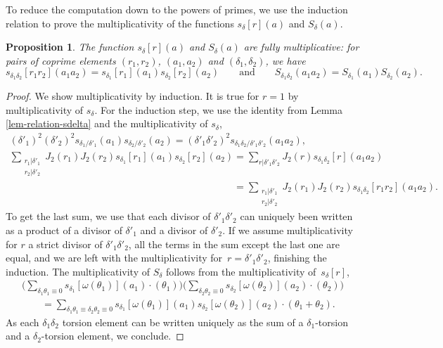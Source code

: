 \documentclass[11pt]{article}
\numberwithin{equation}{section}
\numberwithin{equation}{section}
\newtheorem{prop}[theo]{Proposition}
\theoremstyle{definition}
\begin{document}
To reduce the computation down to the powers of primes, we use the induction relation to prove the multiplicativity of the functions $s_\delta[r](a)$ and $S_\delta(a)$.

\begin{prop}\label{prop-multiplicativity-S}
The function $s_\delta[r](a)$ and $S_\delta(a)$ are fully multiplicative: for pairs of coprime elements $(r_1,r_2)$, $(a_1,a_2)$ and $(\delta_1,\delta_2)$, we have
\[ s_{\delta_1\delta_2}[r_1r_2](a_1a_2) = s_{\delta_1}[r_1](a_1)s_{\delta_2}[r_2](a_2)\qquad
\text{and}\qquad
S_{\delta_1\delta_2}(a_1a_2)=S_{\delta_1}(a_1)S_{\delta_2}(a_2). \]
\end{prop}

\begin{proof}
We show multiplicativity by induction. It is true for $r=1$ by multiplicativity of $s_\delta$. For the induction step, we use the identity from Lemma \ref{lem-relation-sdelta} and the multiplicativity of $s_\delta$,
\begin{gather*}
(\delta'_1)^2(\delta'_2)^2 s_{\delta_1/\delta'_1}(a_1)s_{\delta_2/\delta'_2}(a_2) = (\delta'_1\delta'_2)^2 s_{\delta_1\delta_2/\delta'_1\delta'_2}(a_1a_2), \\
\sum_{\substack{r_1|\delta'_1 \\ r_2|\delta'_2}} J_2(r_1)J_2(r_2)s_{\delta_1}[r_1](a_1)s_{\delta_2}[r_2](a_2) = \sum_{r|\delta'_1\delta'_2} J_2(r)s_{\delta_1\delta_2}[r](a_1a_2) \\
 \phantom{\sum_{\substack{r_1|\delta'_1 \\ r_2|\delta'_2}} J_2(r_1)J_2(r_2)s_{\delta_1}[r_1](a_1)s_{\delta_2}[r_2](a_2) }{}=\sum_{\substack{r_1|\delta'_1 \\ r_2|\delta'_2}} J_2(r_1)J_2(r_2)s_{\delta_1\delta_2}[r_1r_2](a_1a_2).
\end{gather*}
To get the last sum, we use that each divisor of $\delta'_1\delta'_2$ can uniquely been written as a product of a divisor of $\delta'_1$ and a divisor of $\delta'_2$. If we assume multiplicativity for $r$ a strict divisor of $\delta'_1\delta'_2$, all the terms in the sum except the last one are equal, and we are left with the multiplicativity for~${r=\delta'_1\delta'_2}$, finishing the induction. The multiplicativity of $S_\delta$ follows from the multiplicativity of~$s_\delta[r]$,
\begin{gather*}
\biggl(\sum_{\delta_1\theta_1\equiv 0}s_{\delta_1}[\omega(\theta_1)](a_1)\cdot(\theta_1) \biggr)\biggl(\sum_{\delta_2\theta_2\equiv 0}s_{\delta_2}[\omega(\theta_2)](a_2)\cdot(\theta_2) \biggr) \\
\qquad= \sum_{\delta_1\theta_1\equiv\delta_2\theta_2\equiv 0}s_{\delta_1}[\omega(\theta_1)](a_1)s_{\delta_2}[\omega(\theta_2)](a_2)\cdot(\theta_1+\theta_2).
\end{gather*}
As each $\delta_1\delta_2$ torsion element can be written uniquely as the sum of a $\delta_1$-torsion and a $\delta_2$-torsion element, we conclude.
\end{proof}
\end{document}

